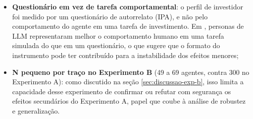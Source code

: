 \begin{itemize}
    generalização cobriu quatro modelos abertos de 7 a 12 bilhões de
    parâmetros com 300 agentes e dois modelos maiores (Nemotron) apenas
    em teste exploratório (N=30), estes acessados por uma cota gratuita
    de API. Modelos proprietários de grande porte (como os das famílias
    GPT, Claude e Gemini) não foram testados, e um modelo previsto para
    essa etapa (Gemma 4 31B) não pôde ser incluído por indisponibilidade
    do provedor gratuito; os resultados podem não se estender a esses
    modelos;
    \item \textbf{Questionário em vez de tarefa comportamental}: o perfil
    de investidor foi medido por um questionário de autorrelato (IPA), e
    não pelo comportamento do agente em uma tarefa de investimento. Em
    , personas de LLM representaram melhor o
    comportamento humano em uma tarefa simulada do que em um
    questionário, o que sugere que o formato do instrumento pode ter
    contribuído para a instabilidade dos efeitos menores;
    \item \textbf{N pequeno por traço no Experimento B} (49 a 69 agentes,
    contra 300 no Experimento A): como discutido na seção
    \ref{sec:discussao-exp-b}, isso limita a capacidade desse experimento
    de confirmar ou refutar com segurança os efeitos secundários do
    Experimento A, papel que coube à análise de robustez e
    generalização.
\end{itemize}
